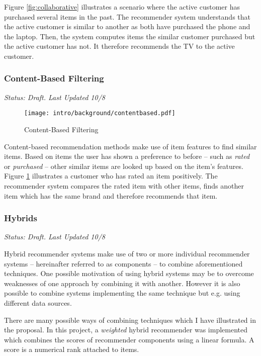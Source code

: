 Figure \ref{fig:collaborative} illustrates a scenario where the active customer has purchased several items in the past. The recommender system understands that the active customer is similar to another as both have purchased the phone and the laptop. Then, the system computes items the similar customer purchased but the active customer has not. It therefore recommends the TV to the active customer.

\subsubsection{Content-Based Filtering}

\emph{Status: Draft. Last Updated 10/8}

\begin{figure}[ht]
    \texttt{[image: intro/background/contentbased.pdf]}
    \caption{Content-Based Filtering}
    \label{fig:contentbased}
\end{figure}

Content-based recommendation methods make use of item features to find similar items. Based on items the user has shown a preference to before -- such as \emph{rated} or \emph{purchased} -- other similar items are looked up based on the item's features. Figure \ref{fig:contentbased} illustrates a customer who has rated an item positively. The recommender system compares the rated item with other items, finds another item which has the same brand and therefore recommends that item.

\subsubsection{Hybrids}
\label{intro-bg-tech-hybrid}

\emph{Status: Draft. Last Updated 10/8}

Hybrid recommender systems make use of two or more individual recommender systems -- hereinafter referred to as components -- to combine aforementioned techniques. One possible motivation of using hybrid systems may be to overcome weaknesses of one approach by combining it with another. However it is also possible to combine systems implementing the same technique but e.g. using different data sources.

There are many possible ways of combining techniques which I have illustrated in the proposal. In this project, a \emph{weighted} hybrid recommender was implemented which combines the scores of recommender components using a linear formula. A score is a numerical rank attached to items.

